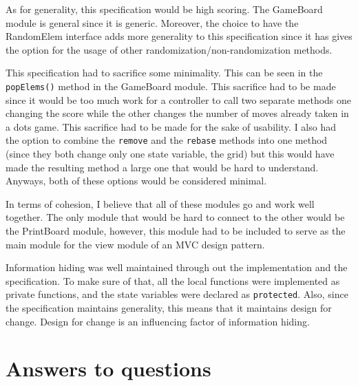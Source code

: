 \documentclass[12pt]{article}
\begin{document}
As for generality, this specification would be high scoring. The GameBoard module is general since it is generic. Moreover, the choice to have the RandomElem interface adds more generality to this specification since it has gives the option for the usage of other randomization/non-randomization methods.

This specification had to sacrifice some minimality. This can be seen in the \verb|popElems()| method in the GameBoard module. This sacrifice had to be made since it would be too much work for a controller to call two separate methods one changing the score while the other changes the number of moves already taken in a dots game. This sacrifice had to be made for the sake of usability. I also had the option to combine the \verb|remove| and the \verb|rebase| methods into one method (since they both change only one state variable, the grid) but this would have made the resulting method a large one that would be hard to understand. Anyways, both of these options would be considered minimal.

In terms of cohesion, I believe that all of these modules go and work well together. The only module that would be hard to connect to the other would be the PrintBoard module, however, this module had to be included to serve as the main module for the view module of an MVC design pattern.

Information hiding was well maintained through out the implementation and the specification. To make sure of that, all the local functions were implemented as private functions, and the state variables were declared as \verb|protected|. Also, since the specification maintains generality, this means that it maintains design for change. Design for change is an influencing factor of information hiding.

\section*{Answers to questions}
\end{document}
